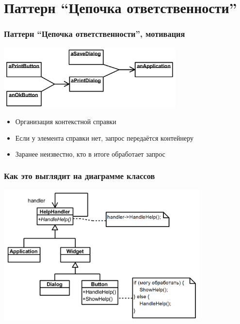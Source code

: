 \documentclass[xetex,mathserif,serif]{beamer}
\begin{document}
	\section{Паттерн ``Цепочка ответственности''}

	\begin{frame}
		\frametitle{Паттерн ``Цепочка ответственности'', мотивация}
		\begin{center}
			\includegraphics[width=0.7\textwidth]{chainOfResponsibilityExample.png}
		\end{center}
		\begin{itemize}
			\item Организация контекстной справки
			\item Если у элемента справки нет, запрос передаётся контейнеру
			\item Заранее неизвестно, кто в итоге обработает запрос
		\end{itemize}
	\end{frame}

	\begin{frame}
		\frametitle{Как это выглядит на диаграмме классов}
		\begin{center}
			\includegraphics[width=0.8\textwidth]{chainOfResponsibilityExampleClasses.png}
		\end{center}
	\end{frame}
\end{document}
